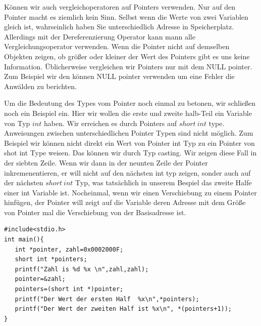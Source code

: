 Können wir auch vergleichoperatoren auf Pointers verwenden. Nur auf den Pointer macht es ziemlich kein Sinn.
Selbst wenn die Werte von zwei Variablen gleich ist, wahrseinlich haben Sie unterschiedlich Adresse in Speicherplatz.
Allerdings mit der Dereferenzierung Operator kann mann alle Vergleichungsoperator verwenden. Wenn die Pointer nicht
auf demselben Objekten zeigen, ob größer oder kleiner der Wert des Pointers gibt es uns keine Information. 
Üblicherweise vergleichen wir Pointers nur mit dem NULL pointer. Zum Beispiel wir den können NULL pointer 
verwenden um eine Fehler die Anwälden zu berichten.

Um die Bedeutung des Types vom Pointer noch einmal zu betonen, wir schließen noch ein Beispiel ein.
Hier wir wollen die erste und zweite halb-Teil ein Variable von Typ $int$ haben. Wir erreichen es
durch Pointers auf $short~int$ type. Anweisungen zwischen unterschiedlichen Pointer Typen sind nicht möglich.
Zum Beispiel wir können nicht direkt ein Wert von Pointer int Typ zu ein Pointer von shot int Type weisen.
Das können wir durch Typ casting. Wir zeigen diese Fall in der siebten Zeile. Wenn wir dann in der
neunten Zeile der Pointer inkremenentieren, er will nicht auf den nächsten int typ zeigen, sonder auch
auf der nächsten $short~int$ Typ, was tatsächlich in unserem Bespiel das zweite Halfe einer int Variable
ist. Nocheinmal, wenn wir einen Verschiebung zu einem Pointer hinfügen, der Pointer will zeigt auf die Variable
deren Adresse mit dem Größe von Pointer mal die Verschiebung von der Basisadresse ist.

\begin{lstlisting}
#include<stdio.h>
int main(){
   int *pointer, zahl=0x0002000F;
   short int *pointers;
   printf("Zahl is %d %x \n",zahl,zahl);
   pointer=&zahl;
   pointers=(short int *)pointer;
   printf("Der Wert der ersten Half  %x\n",*pointers);
   printf("Der Wert der zweiten Half ist %x\n", *(pointers+1));
}
\end{lstlisting}


\endinput
